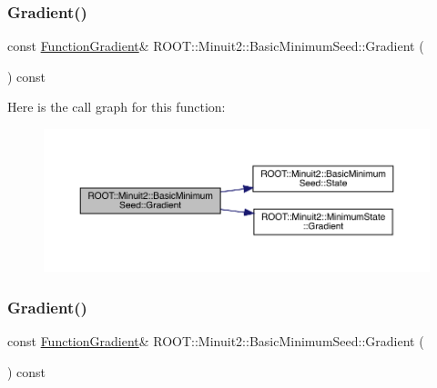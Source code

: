 \subsubsection{\texorpdfstring{Gradient()}{Gradient()}\hspace{0.1cm}{\footnotesize\ttfamily [2/3]}}
{\footnotesize\ttfamily const \mbox{\hyperlink{classROOT_1_1Minuit2_1_1FunctionGradient}{Function\+Gradient}}\& R\+O\+O\+T\+::\+Minuit2\+::\+Basic\+Minimum\+Seed\+::\+Gradient (\begin{DoxyParamCaption}{ }\end{DoxyParamCaption}) const\hspace{0.3cm}{\ttfamily [inline]}}

Here is the call graph for this function\+:
\nopagebreak
\begin{figure}[H]
\begin{center}
\leavevmode
\includegraphics[width=350pt]{de/d50/classROOT_1_1Minuit2_1_1BasicMinimumSeed_ab61377b63a177c93629ccb3e69e173db_cgraph}
\end{center}
\end{figure}
\mbox{\label{classROOT_1_1Minuit2_1_1BasicMinimumSeed_ab61377b63a177c93629ccb3e69e173db}} 
\subsubsection{\texorpdfstring{Gradient()}{Gradient()}\hspace{0.1cm}{\footnotesize\ttfamily [3/3]}}
{\footnotesize\ttfamily const \mbox{\hyperlink{classROOT_1_1Minuit2_1_1FunctionGradient}{Function\+Gradient}}\& R\+O\+O\+T\+::\+Minuit2\+::\+Basic\+Minimum\+Seed\+::\+Gradient (\begin{DoxyParamCaption}{ }\end{DoxyParamCaption}) const\hspace{0.3cm}{\ttfamily [inline]}}

